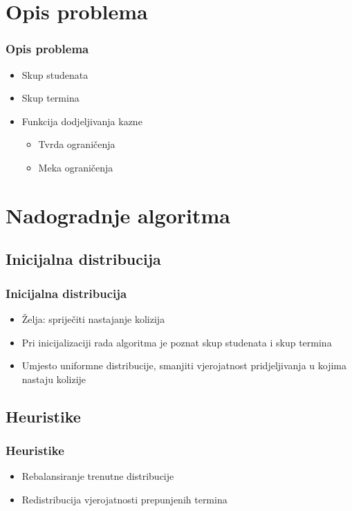 \documentclass{beamer}
\begin{document}
\section{Opis problema}
\begin{frame}
\frametitle{Opis problema}
\begin{itemize}
  \item Skup studenata
  \item Skup termina
  \item Funkcija dodjeljivanja kazne
  \begin{itemize}
    \item Tvrda ograničenja
    \item Meka ograničenja
  \end{itemize}
\end{itemize}
\end{frame}

\section{Nadogradnje algoritma}

\subsection{Inicijalna distribucija}
\begin{frame}
\frametitle{Inicijalna distribucija}
\begin{itemize}
  \item Želja: spriječiti nastajanje kolizija
  \item Pri inicijalizaciji rada algoritma je poznat skup studenata i skup termina
  \item Umjesto uniformne distribucije, smanjiti vjerojatnost pridjeljivanja u kojima nastaju kolizije
\end{itemize}
\end{frame}

\subsection{Heuristike}
\begin{frame}
\frametitle{Heuristike}
\begin{itemize}
  \item Rebalansiranje trenutne distribucije
  \item Redistribucija vjerojatnosti prepunjenih termina
\end{itemize}
\end{frame}
\end{document}
